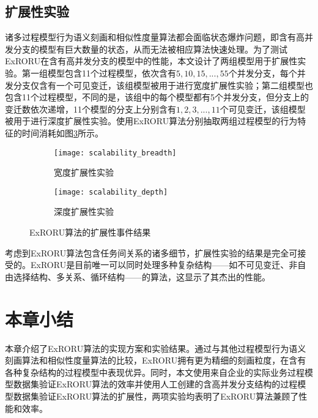 \subsection{扩展性实验}\label{subsec:scalability}
诸多过程模型行为语义刻画和相似性度量算法都会面临状态爆炸问题，即含有高并发分支的模型有巨大数量的状态，从而无法被相应算法快速处理。为了测试ExRORU在含有高并发分支的模型中的性能，本文设计了两组模型用于扩展性实验。第一组模型包含11个过程模型，依次含有$5,10,15,...,55$个并发分支，每个并发分支仅含有一个可见变迁，该组模型被用于进行宽度扩展性实验；第二组模型也包含11个过程模型，不同的是，该组中的每个模型都有5个并发分支，但分支上的变迁数依次递增，11个模型的分支上分别含有$1,2,3,...,11$个可见变迁，该组模型被用于进行深度扩展性实验。使用ExRORU算法分别抽取两组过程模型的行为特征的时间消耗如图\ref{fig:scalability}所示。

\begin{figure}[htbp]
  \centering
  \begin{subfigure}{0.48\textwidth}
    \centering
    \texttt{[image: scalability\_breadth]}
    \caption{宽度扩展性实验}
    \label{fig:scalability_breadth}
  \end{subfigure}
  \begin{subfigure}{0.48\textwidth}
    \centering
    \texttt{[image: scalability\_depth]}
    \caption{深度扩展性实验}
    \label{fig:scalability_depth}
  \end{subfigure}
  \vspace{6pt}
  \caption{ExRORU算法的扩展性事件结果}
  \label{fig:scalability}
\end{figure}

考虑到ExRORU算法包含任务间关系的诸多细节，扩展性实验的结果是完全可接受的。ExRORU是目前唯一可以同时处理多种复杂结构——如不可见变迁、非自由选择结构、多关系、循环结构——的算法，这显示了其杰出的性能。

\section{本章小结}
本章介绍了ExRORU算法的实现方案和实验结果。通过与其他过程模型行为语义刻画算法和相似性度量算法的比较，ExRORU拥有更为精细的刻画粒度，在含有各种复杂结构的过程模型中表现优异。同时，本文使用来自企业的实际业务过程模型数据集验证ExRORU算法的效率并使用人工创建的含高并发分支结构的过程模型数据集验证ExRORU算法的扩展性，两项实验均表明了ExRORU算法兼顾了性能和效率。
